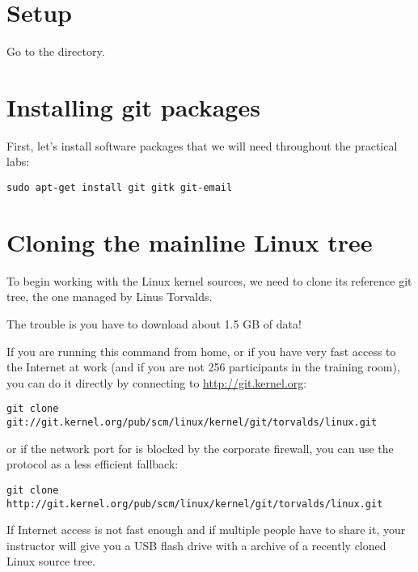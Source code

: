 
\section{Setup}

Go to the  directory.

\section{Installing git packages}

First, let's install software packages that we will need
throughout the practical labs:

\begin{verbatim}
sudo apt-get install git gitk git-email
\end{verbatim}

\section{Cloning the mainline Linux tree}

To begin working with the Linux kernel sources, we need to clone its
reference git tree, the one managed by Linus Torvalds.

The trouble is you have to download about 1.5 GB of data!

If you are running this command from home, or if you have very fast
access to the Internet at work (and if you are not 256 participants in the
training room), you can do it directly by connecting to
\url{http://git.kernel.org}:

{\small
\begin{verbatim}
git clone git://git.kernel.org/pub/scm/linux/kernel/git/torvalds/linux.git
\end{verbatim}
}

or if the network port for  is blocked by the corporate
firewall, you can use the  protocol as a less efficient
fallback:

{\small
\begin{verbatim}
git clone http://git.kernel.org/pub/scm/linux/kernel/git/torvalds/linux.git 
\end{verbatim}
}

If Internet access is not fast enough and if multiple people have to
share it, your instructor will give you a USB flash drive with a
 archive of a recently cloned Linux source tree.

